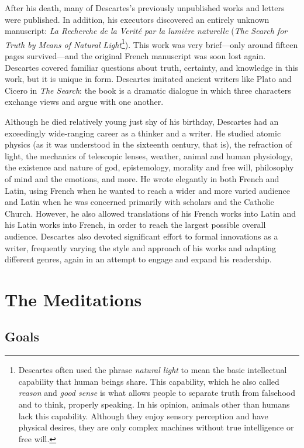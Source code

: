 After his death, many of Descartes's previously unpublished works and letters were published. In addition, his executors discovered an entirely unknown manuscript: \textit{La Recherche de la Verité par la lumière naturelle} (\textit{The Search for Truth by Means of Natural Light}\footnote{Descartes often used the phrase \textit{natural light} to mean the basic intellectual capability that human beings share. This capability, which he also called \textit{reason} and \textit{good sense} is what allows people to separate truth from falsehood and to think, properly speaking. In his opinion, animals other than humans lack this capability. Although they enjoy sensory perception and have physical desires, they are only complex machines without true intelligence or free will.}). This work was very brief---only around fifteen pages survived---and the original French manuscript was soon lost again. Descartes covered familiar questions about truth, certainty, and knowledge in this work, but it is unique in form. Descartes imitated ancient writers like Plato and Cicero in \textit{The Search}: the book is a dramatic dialogue in which three characters exchange views and argue with one another.

Although he died relatively young just shy of his  birthday, Descartes had an exceedingly wide-ranging career as a thinker and a writer. He studied atomic physics (as it was understood in the sixteenth century, that is), the refraction of light, the mechanics of telescopic lenses, weather, animal and human physiology, the existence and nature of god, epistemology, morality and free will, philosophy of mind and the emotions, and more. He wrote elegantly in both French and Latin, using French when he wanted to reach a wider and more varied audience and Latin when he was concerned primarily with scholars and the Catholic Church. However, he also allowed translations of his French works into Latin and his Latin works into French, in order to reach the largest possible overall audience. Descartes also devoted significant effort to formal innovations as a writer, frequently varying the style and approach of his works and adapting different genres, again in an attempt to engage and expand his readership.

\section*{The Meditations}

\subsection*{Goals}

